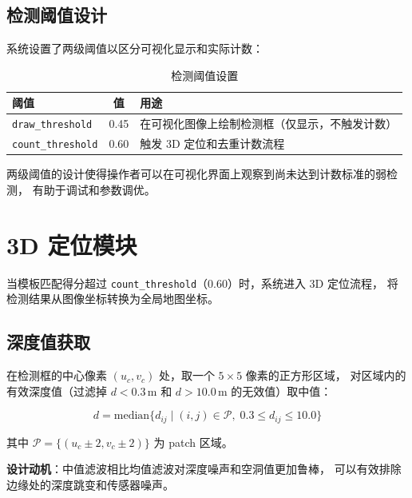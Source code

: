 \documentclass[12pt,a4paper]{article}
\begin{document}
\subsection{检测阈值设计}

系统设置了两级阈值以区分可视化显示和实际计数：

\begin{table}[H]
\centering
\caption{检测阈值设置}
\label{tab:thresholds}
\begin{tabular}{@{}lcp{8cm}@{}}
\toprule
\textbf{阈值} & \textbf{值} & \textbf{用途} \\
\midrule
\texttt{draw\_threshold} & 0.45 & 在可视化图像上绘制检测框（仅显示，不触发计数） \\
\texttt{count\_threshold} & 0.60 & 触发 3D 定位和去重计数流程 \\
\bottomrule
\end{tabular}
\end{table}

两级阈值的设计使得操作者可以在可视化界面上观察到尚未达到计数标准的弱检测，
有助于调试和参数调优。

\section{3D 定位模块}
\label{sec:3d_localization}

当模板匹配得分超过 \texttt{count\_threshold}（0.60）时，系统进入 3D 定位流程，
将检测结果从图像坐标转换为全局地图坐标。

\subsection{深度值获取}

在检测框的中心像素 $(u_c, v_c)$ 处，取一个 $5 \times 5$ 像素的正方形区域，
对区域内的有效深度值（过滤掉 $d < 0.3$\,m 和 $d > 10.0$\,m 的无效值）取中值：

\begin{equation}
  d = \text{median}\bigl\{d_{ij} \mid (i, j) \in \mathcal{P},\; 0.3 \leq d_{ij} \leq 10.0 \bigr\}
  \label{eq:depth_median}
\end{equation}

其中 $\mathcal{P} = \{(u_c \pm 2, v_c \pm 2)\}$ 为 patch 区域。

\textbf{设计动机}：中值滤波相比均值滤波对深度噪声和空洞值更加鲁棒，
可以有效排除边缘处的深度跳变和传感器噪声。
\end{document}
